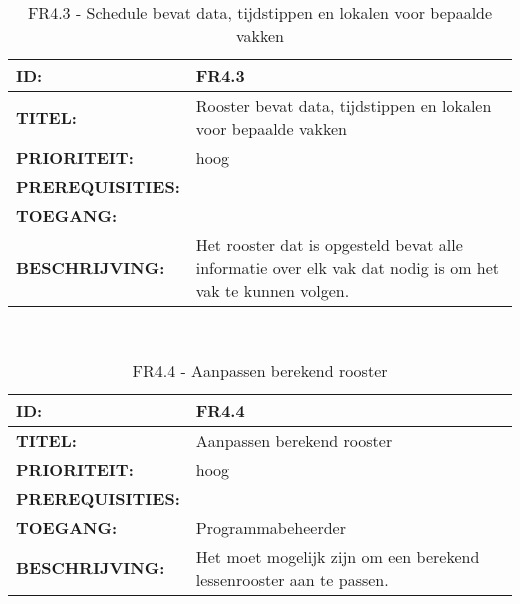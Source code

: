 \noindent\begin{table}[H]
	\begin{tabular}{l | p{10cm}}
	\textbf{ID:} & FR4.3 \\ \hline
	\textbf{TITEL:} & Rooster bevat data, tijdstippen en lokalen voor bepaalde vakken\\ \hline
	\textbf{PRIORITEIT:} &  hoog \\ \hline
	\textbf{PREREQUISITIES:} & \\ \hline
	\textbf{TOEGANG:} &  \\ \hline
	\textbf{BESCHRIJVING:} & Het rooster dat is opgesteld bevat alle informatie over elk vak dat nodig is om het vak te kunnen volgen.\\
	\end{tabular}\\
	\caption{FR4.3 - Schedule bevat data, tijdstippen en lokalen voor bepaalde vakken}
	\label{tab:FR4.3 - Schedule bevat data, tijdstippen en lokalen voor bepaalde vakken}
\end{table}
       
\noindent\begin{table}[H]
            \begin{tabular}{l | p{10cm}}
                \textbf{ID:} & FR4.4 \\ \hline
                \textbf{TITEL:} & Aanpassen berekend rooster \\ \hline
                \textbf{PRIORITEIT:} &  hoog \\ \hline
                \textbf{PREREQUISITIES:} & \\ \hline
                \textbf{TOEGANG:} & Programmabeheerder \\ \hline
                \textbf{BESCHRIJVING:} & Het moet mogelijk zijn om een berekend lessenrooster aan te passen.\\
            \end{tabular}\\
            \caption{FR4.4 - Aanpassen berekend rooster}
            \label{tab:FR4.4 - Aanpassen berekend rooster}
        \end{table}
        
